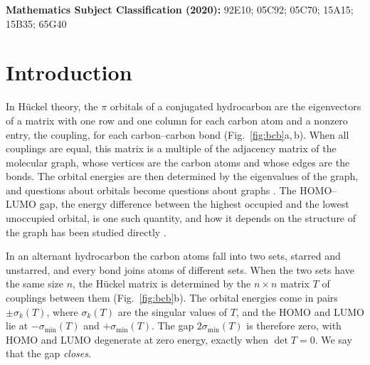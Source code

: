 \documentclass[11pt]{article}
\begin{document}
\noindent\textbf{Mathematics Subject Classification (2020):} 92E10; 05C92; 05C70; 15A15; 15B35; 65G40

\section{Introduction}

In H\"uckel theory, the $\pi$ orbitals of a conjugated hydrocarbon are the eigenvectors of a matrix with one row and one column for each carbon atom and a nonzero entry, the coupling, for each carbon--carbon bond (Fig.~\ref{fig:bcb}a,\,b). When all couplings are equal, this matrix is a multiple of the adjacency matrix of the molecular graph, whose vertices are the carbon atoms and whose edges are the bonds. The orbital energies are then determined by the eigenvalues of the graph, and questions about orbitals become questions about graphs \citep{GutmanPolansky1986,CvetkovicDoobSachs1980}. The HOMO--LUMO gap, the energy difference between the highest occupied and the lowest unoccupied orbital, is one such quantity, and how it depends on the structure of the graph has been studied directly \citep{GutmanRouvray1979,FowlerPisanski2010}.

In an alternant hydrocarbon the carbon atoms fall into two sets, starred and unstarred, and every bond joins atoms of different sets. When the two sets have the same size $n$, the H\"uckel matrix is determined by the $n\times n$ matrix $T$ of couplings between them (Fig.~\ref{fig:bcb}b). The orbital energies come in pairs $\pm\sigma_k(T)$, where $\sigma_k(T)$ are the singular values of $T$, and the HOMO and LUMO lie at $-\sigma_{\min}(T)$ and $+\sigma_{\min}(T)$. The gap $2\sigma_{\min}(T)$ is therefore zero, with HOMO and LUMO degenerate at zero energy, exactly when $\det T=0$. We say that the gap \emph{closes}.
\end{document}
